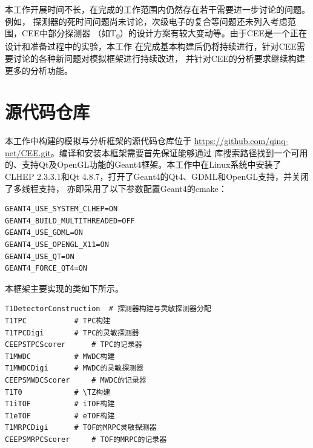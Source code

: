 \documentclass[bachelor,openany,oneside,color]{buaathesis}
\def\TZ{T\textsubscript{0}}
\begin{document}
本工作开展时间不长，在完成的工作范围内仍然存在若干需要进一步讨论的问题。例如，
探测器的死时间问题尚未讨论，次级电子的复合等问题还未列入考虑范围，CEE中部分探测器
（如\TZ）的设计方案有较大变动等。由于CEE是一个正在设计和准备过程中的实验，本工作
在完成基本构建后仍将持续进行，针对CEE需要讨论的各种新问题对模拟框架进行持续改进，
并针对CEE的分析要求继续构建更多的分析功能。



%
\printbibliography[heading=bibintoc,title={参考文献}]

\appendix
\chapter{源代码仓库}\label{chapter:repo}
本工作中构建的模拟与分析框架的源代码仓库位于
\url{https://github.com/qinq-net/CEE.git}。编译和安装本框架需要首先保证能够通过
库搜索路径找到一个可用的、支持Qt及OpenGL功能的Geant4框架。本工作中在Linux系统中安装了
CLHEP 2.3.3.1和Qt 4.8.7，打开了Geant4的Qt4、GDML和OpenGL支持，并关闭了多线程支持，
亦即采用了以下参数配置Geant4的cmake：

\begin{lstlisting}
GEANT4_USE_SYSTEM_CLHEP=ON
GEANT4_BUILD_MULTITHREADED=OFF
GEANT4_USE_GDML=ON
GEANT4_USE_OPENGL_X11=ON
GEANT4_USE_QT=ON
GEANT4_FORCE_QT4=ON
\end{lstlisting}

本框架主要实现的类如下所示。

\begin{lstlisting}
T1DetectorConstruction	# 探测器构建与灵敏探测器分配
T1TPC			# TPC构建
T1TPCDigi		# TPC的灵敏探测器
CEEPSTPCScorer		# TPC的记录器
T1MWDC 			# MWDC构建
T1MWDCDigi		# MWDC的灵敏探测器
CEEPSMWDCScorer		# MWDC的记录器
T1T0			# \TZ构建
T1iTOF 			# iTOF构建
T1eTOF 			# eTOF构建
T1MRPCDigi 		# TOF的MRPC灵敏探测器
CEEPSMRPCScorer		# TOF的MRPC的记录器
\end{lstlisting}
%
%
\end{document}
